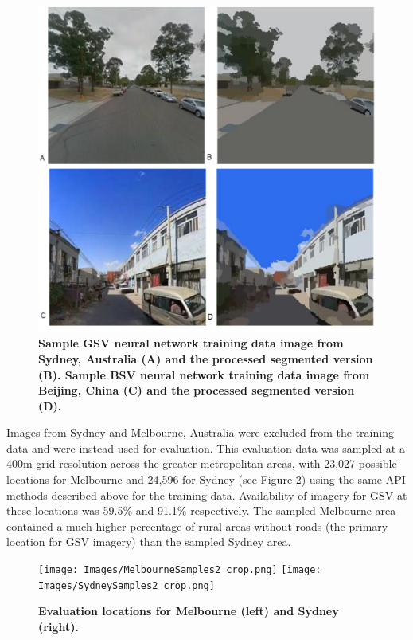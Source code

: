 \documentclass[Crown,sageh,times]{sagej}
\begin{document}
\begin{figure}[!htbp]
\includegraphics[scale=0.3]{Images/PlosOne/Fig4.png} 
\caption{\bf Sample GSV neural network training data image from Sydney, Australia \cite{GoogleMaps2017b} (A) and the processed segmented version (B). Sample BSV neural network training data image from Beijing, China \cite{Baidu2017} (C) and the processed segmented version (D).}    
 \label{fig:gsvbsv}  
\end{figure} 




Images from Sydney and Melbourne, Australia were excluded from the training data and were instead used for evaluation. This evaluation data was sampled at a 400m grid resolution across the greater metropolitan areas, with 23,027 possible locations for Melbourne and 24,596 for Sydney (see Figure \ref{fig:melsydevallocations}) using the same API methods described above for the training data. Availability of imagery for GSV at these locations was 59.5\% and 91.1\% respectively. The sampled Melbourne area contained a much higher percentage of rural areas without roads (the primary location for GSV imagery) than the sampled Sydney area.


\begin{figure}[!htbp]
\centering 
\texttt{[image: Images/MelbourneSamples2\_crop.png]}   
\texttt{[image: Images/SydneySamples2\_crop.png]}    
\caption{\bf Evaluation locations for Melbourne (left) and Sydney (right). }    
 \label{fig:melsydevallocations}  
\end{figure} 
\end{document}
